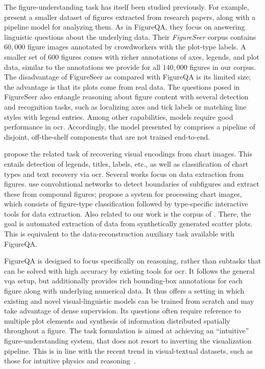\documentclass{article} %
\begin{document}
The figure-understanding task has itself been studied previously.
For example, \citet{siegel2016figureseer} present a smaller dataset of figures extracted from research papers, along with a pipeline model for analyzing them.
As in FigureQA, they focus on answering linguistic questions about the underlying data. 
Their \emph{FigureSeer} corpus contains $60,000$ figure images annotated by crowdworkers with the plot-type labels.
A smaller set of 600 figures comes with richer annotations of axes, legends, and plot data, similar to the annotations we provide for all $140,000$ figures in our corpus.
The disadvantage of FigureSeer as compared with FigureQA is its limited size; the advantage is that its plots come from real data.
The questions posed in FigureSeer also entangle reasoning about figure content with several detection and recognition tasks, such as localizing axes and tick labels or matching line styles with legend entries. Among other capabilities, models require good performance in \gls{ocr}.
Accordingly, the model presented by \citet{siegel2016figureseer} comprises a pipeline of disjoint, off-the-shelf components that are not trained end-to-end.

\citet{poco2017reverse} propose the related task of recovering visual encodings from chart images. This entails detection of legends, titles, labels, etc., as well as classification of chart types and text recovery via \gls{ocr}.
Several works focus on data extraction from figures.
\citet{tsutsui2017data} use convolutional networks to detect boundaries of subfigures and extract these from compound figures;
\citet{jung2017chartsense} propose a system for processing chart images, which consists of figure-type classification followed by type-specific interactive tools for data extraction.
Also related to our work is the corpus of \citet{cliche2017scatteract}.
There, the goal is automated extraction of data from synthetically generated scatter plots. This is equivalent to the data-reconstruction auxiliary task available with FigureQA.

FigureQA is designed to focus specifically on reasoning, rather than subtasks that can be solved with high accuracy by existing tools for \gls{ocr}.
It follows the general \gls{vqa} setup, but additionally provides rich 
bounding-box annotations for each figure along with underlying numerical data.
It thus offers a setting in which existing and novel visual-linguistic models can be trained from scratch 
and may take advantage of dense supervision.
Its questions often require reference to multiple plot elements and synthesis of information distributed spatially throughout a figure.
The task formulation is aimed at achieving an ``intuitive'' figure-understanding system, that does not resort to inverting the visualization pipeline. This is in line with the recent trend in visual-textual datasets, such as those for intuitive physics and reasoning~\citep{goyal2017something,mun2016marioqa}.
\end{document}
